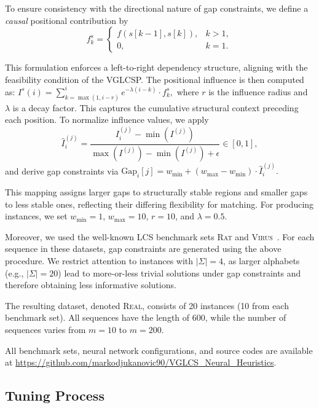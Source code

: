 \documentclass[runningheads]{llncs}
\begin{document}
To ensure consistency with the directional nature of gap constraints, we define a \emph{causal} positional contribution by
\[
f^s_k =
\begin{cases}
	f(s[k-1], s[k]), & k > 1, \\
	0, & k = 1.
\end{cases}
\]

This formulation enforces a left-to-right dependency structure, aligning with the feasibility condition of the VGLCSP. The positional influence is then computed as: $
I^s(i) = \sum_{k=\max(1,i-r)}^{i} e^{-\lambda (i-k)} \cdot f^s_k,$
where $r$ is the influence radius and $\lambda$ is a decay factor. This captures the cumulative structural context preceding each position.  To normalize influence values, we apply
\[
\hat{I}^{(j)}_i = \frac{I^{(j)}_i - \min(I^{(j)})}{\max(I^{(j)}) - \min(I^{(j)}) + \epsilon} \in [0,1],
\]
and derive gap constraints via $
\text{Gap}_i[j] = w_{\min} + (w_{\max} - w_{\min}) \cdot \hat{I}^{(j)}_i. $

This mapping assigns larger gaps to structurally stable regions and smaller gaps to less stable ones, reflecting their differing flexibility for matching. For producing instances, we set $w_{\min}=1$, $w_{\max}=10$, $r=10$, and $\lambda=0.5$.


\noindent
Moreover, we used the well-known LCS benchmark sets \textsc{Rat} and \textsc{Virus}~\cite{DJUKANOVIC2020106499}. For each sequence in these datasets, gap constraints are generated using the above procedure. We restrict attention to instances with $|\Sigma|=4$, as larger alphabets (e.g., $|\Sigma|=20$) lead to more-or-less trivial solutions under gap constraints and therefore obtaining less informative solutions.

The resulting dataset, denoted \textsc{Real}, consists of 20 instances (10 from each benchmark set). All sequences have the length of 600, while the number of sequences varies from $m=10$ to $m=200$.


 All benchmark sets, neural network configurations, and source codes  are available at   
\url{https://github.com/markodjukanovic90/VGLCS\_Neural\_Heuristics}. 
 
\subsection{Tuning Process}
\end{document}

